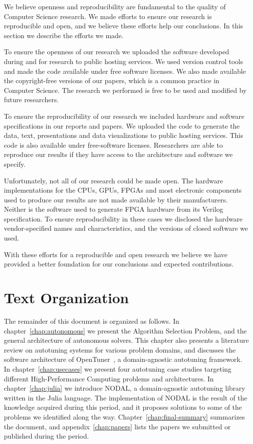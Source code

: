 We believe openness and reproducibility are fundamental to the quality of
Computer Science research. We made efforts to ensure our research is
reproducible and open, and we believe these efforts help our conclusions.  In
this section we describe the efforts we made.

To ensure the openness of our research we uploaded the software developed
during and for research to public hosting services. We used version control
tools and made the code available under free software licenses. We also
made available the copyright-free versions of our papers, which is a common
practice in Computer Science. The research we performed is free to be used and
modified by future researchers.

To ensure the reproducibility of our research we included hardware and software
specifications in our reports and papers. We uploaded the code to generate the
data, text, presentations and data visualizations to public hosting services.
This code is also available under free-software licenses. Researchers are able
to reproduce our results if they have access to the architecture and software
we specify.

Unfortunately, not all of our research could be made open. The hardware
implementations for the CPUs, GPUs, FPGAs and most electronic components used
to produce our results are not made available by their manufacturers. Neither
is the software used to generate FPGA hardware from its Verilog specification.
To ensure reproducibility in these cases we disclosed the hardware
vendor-specified names and characteristics, and the versions of closed software
we used.

With these efforts for a reproducible and open research we believe we have
provided a better foundation for our conclusions and expected contributions.

\section{Text Organization}
\label{sec:org}

The remainder of this document is organized as follows.  In
chapter~\ref{chap:autonomous} we present the Algorithm Selection Problem, and
the general architecture of autonomous solvers. This chapter also presents a
literature review on autotuning systems for various problem domains, and
discusses the software architecture of OpenTuner~\cite{ansel2014opentuner}, a
domain-agnostic autotuning framework.  In chapter~\ref{chap:usecases} we
present four autotuning case studies targeting different High-Performance
Computing problems and architectures.  In chapter~\ref{chap:julia} we introduce
NODAL, a domain-agnostic autotuning library written in the Julia language. The
implementation of NODAL is the result of the knowledge acquired during this
period, and it proposes solutions to some of the problems we identified along
the way.  Chapter~\ref{chap:final-summary} summarizes the document, and
appendix~\ref{chap:papers} lists the papers we submitted or published during
the period.
